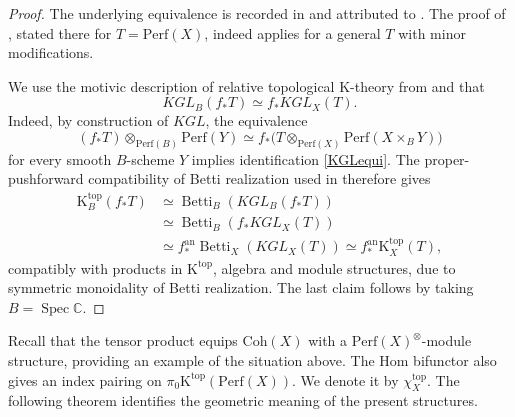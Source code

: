 \documentclass{amsart}
\theoremstyle{plain}
\theoremstyle{definition}
\newcommand{\bbC}{\mathbb{C}}
\newcommand{\Perf}{\mathrm{Perf}}
\newcommand{\K}{\mathrm{K}}
\newcommand{\Coh}{\mathrm{Coh}}
\DeclareMathOperator{\Spec}{Spec}
\newcommand{\an}{\mathrm{an}}
\begin{document}
\begin{proof}

The underlying equivalence is recorded in \cite[Theorem~2.12]{GS22} and attributed to \cite{Mou19}.
The proof of \cite[Proposition~7.8]{Mou19}, stated there for
$T=\Perf(X)$, indeed applies for a general $T$ with minor modifications.

We use the motivic description of relative topological $\K$-theory from \cite[Section~7.3, especially Proposition 7.7]{Mou19} and that
\begin{equation}\label{KGLequi}
KGL_B(f_*T)\simeq f_*KGL_X(T).
\end{equation}
Indeed, by construction of $KGL$, the equivalence
\[
(f_*T)\otimes_{\Perf(B)}\Perf(Y)
\simeq
f_*\bigl(T\otimes_{\Perf(X)}\Perf(X\times_B Y)\bigr)
\]
for every smooth $B$-scheme $Y$
implies identification \eqref{KGLequi}. The proper-pushforward compatibility of Betti realization used in \cite[Proof of Proposition~7.8]{Mou19}
therefore gives
\[
\begin{aligned}
\K^{\mathrm{top}}_B(f_*T)
&\simeq \operatorname{Betti}_B(KGL_B(f_*T))\\
&\simeq \operatorname{Betti}_B(f_*KGL_X(T))\\
&\simeq f^\an_*\operatorname{Betti}_X(KGL_X(T))
 \simeq f^\an_*\K^{\mathrm{top}}_X(T),
\end{aligned}
\]
compatibly with products in $\K^{\mathrm{top}}$,
algebra and module structures, due to symmetric monoidality of Betti realization. The last claim follows by taking $B=\Spec\bbC$.
\end{proof}



Recall that the tensor product equips $\Coh(X)$ with a $\Perf(X)^\otimes$-module structure, providing an example of the situation above. The Hom bifunctor also gives an
index pairing on
$\pi_0\K^{\mathrm{top}}(\Perf(X))$. We denote it by
$\chi_X^{\mathrm{top}}$. The following theorem identifies the geometric meaning of the present structures.
\end{document}
